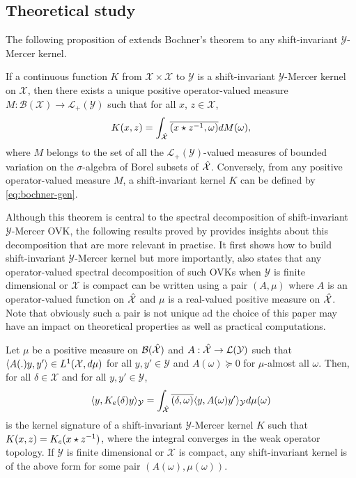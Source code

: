 \subsection{Theoretical study}
The following proposition of \citet{Zhang2012,Carmeli2010} extends Bochner's theorem to any shift-invariant $\mathcal{Y}$-Mercer kernel. 
\begin{proposition}\label{eq:bochner-gen}
If a continuous function $K$ from $\mathcal{X} \times \mathcal{X}$ to $\mathcal{Y}$ is a shift-invariant $\mathcal{Y}$-Mercer kernel on $\mathcal{X}$, then there exists a unique positive operator-valued measure $M: \mathcal{B}(\mathcal{X}) \to \mathcal{L}_+(\mathcal{Y})$ such that for all $x$, $z \in \mathcal{X}$,
\begin{dmath}
K(x, z) = \int_{\dual{\mathcal{X}}} \conj{\pairing{x \groupop \inv{z}, \omega}} dM(\omega),
\end{dmath}
where $M$ belongs to the set of all the $\mathcal{L}_+(\mathcal{Y})$-valued measures of bounded variation on the $\sigma$-algebra of Borel subsets of $\hat{\mathcal{X}}$. Conversely, from any positive operator-valued measure $M$, a shift-invariant kernel $K$ can be defined by \cref{eq:bochner-gen}. 
\end{proposition}
Although this theorem is central to the spectral decomposition of shift-invariant $\mathcal{Y}$-Mercer \acs{OVK}, the following results proved by \citet{Carmeli2010} provides insights about this decomposition that are more relevant in practise. It first shows how to build shift-invariant $\mathcal{Y}$-Mercer kernel but more importantly, also states that any operator-valued spectral decomposition of such \acs{OVK}s when $\mathcal{Y}$ is finite dimensional or $\mathcal{X}$ is compact can be written using a pair $(A, \mu)$ where $A$ is an operator-valued function on $\hat{\mathcal{X}}$ and $\mu$ is a real-valued positive measure on $\hat{\mathcal{X}}$. Note that obviously such a pair is not unique ad the choice of this paper may have an impact on theoretical properties as well as practical computations.
\begin{proposition}\label{pr:mercer_kernel_bochner}
Let $\mu$ be a positive measure on $\mathcal{B}(\mathcal{\hat{\mathcal{X}}})$ and $A: \hat{\mathcal{X}}\to \mathcal{L}(\mathcal{Y})$ such that $\langle A(.)y,y'\rangle\in L^1(\mathcal{X},d\mu)$ for all $y,y'\in\mathcal{Y}$ and $A(\omega)\succcurlyeq 0$ for $\mu$-almost all $\omega$. Then, for all $\delta \in \mathcal{X}$ and for all $y, y' \in \mathcal{Y}$,
\begin{dmath}
\label{eq:AK0}
\inner{y,K_e(\delta)y}_{\mathcal{Y}}=\int_{\dual{\mathcal{X}}}\conj{\pairing{\delta,\omega}}\inner{y,A(\omega)y'}_{\mathcal{Y}}d\mu(\omega)
\end{dmath}
is the kernel signature of a shift-invariant $\mathcal{Y}$-Mercer kernel $K$ such that $K(x,z)=K_e(x \star {z}^{-1})$, where the integral converges in the weak operator topology. If $\mathcal{Y}$ is finite dimensional or $\mathcal{X}$ is compact, any shift-invariant kernel is of the above form for some pair $(A(\omega),\mu (\omega))$. 
\end{proposition}
